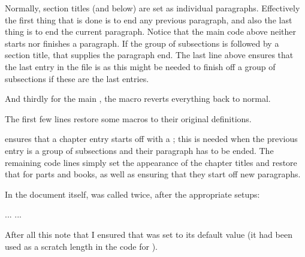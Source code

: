     Normally, section titles (and below) are set as individual 
paragraphs. Effectively the first thing that is done is to end any 
previous paragraph, and also the last thing is to end the current 
paragraph. Notice that the main code above neither starts nor finishes 
a paragraph. If the group of subsections is followed by a section title, 
that supplies the paragraph end. The last line above ensures that
the last entry in the  file is  as this might be
needed to finish off a group of subsections if these are the last 
entries.

And thirdly for the main \toc, the macro \cmd{\setupmaintoc} reverts 
everything back to normal.
\begin{lcode}
\newcommand*{\setupmaintoc}{%
  \renewcommand{\contentsname}{Contents}
  \let\changetocdepth\oldchangetocdepth
  \let\precistoctext\oldprecistoctext
  \let\cftchapterfillnum\oldcftchapterfillnum
  \addtodef{\cftchapterbreak}{\par}{}
  \renewcommand*{\cftchapterfont}{\normalfont\sffamily}
  \renewcommand*{\cftchapterleader}{%
                 \sffamily\cftdotfill{\cftchapterdotsep}}
  \renewcommand*{\cftchapterafterpnum}{}
  \renewcommand{\cftchapterbreak}{\par\addpenalty{-\@highpenalty}}
  \setpnumwidth{2.55em}
  \setrmarg{3.55em}
  \setcounter{tocdepth}{2}}
  \let\cftpartformatpnum\oldcftpartformatpnum
    \addtodef{\cftpartbreak}{\par}{}
  \let\cftbookformatpnum\oldcftbookformatpnum
    \addtodef{\cftbookbreak}{\par}{}
\end{lcode}
The first few lines restore some macros to their original definitions.
\begin{lcode}
\addtodef{\cftchapterbreak}{\par}{}
\end{lcode}
ensures that a chapter entry starts off with a ; this is needed
when the previous entry is a group of subsections and their paragraph
has to be ended. The remaining code lines simply set the appearance of 
the chapter titles and restore that for parts and books, as well as ensuring
that they start off new paragraphs.

In the document itself, \cmd{\tableofcontents} was called twice, 
after the appropriate setups:
\begin{lcode}
...
\setupshorttoc
\tableofcontents
\clearpage
\setupparasubsecs
\setupmaintoc
\tableofcontents
\setlength{\unitlength}{1pt}
...
\end{lcode}
After all this note that I ensured that \lnc{\unitlength} was set 
to its default value (it had been used as a scratch length in the 
code for \cmd{\setupparasubsecs}).


